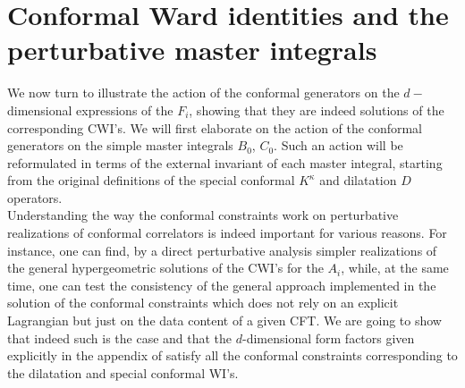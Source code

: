 \documentclass[a4paper,11pt,openright,twoside]{book}
\numberwithin{equation}{section}
\begin{document}
{{\section{Conformal Ward identities and the perturbative master integrals}
We now turn to illustrate the action of the conformal generators on the $d-$dimensional expressions of the $F_i$, showing that they are indeed solutions of the corresponding CWI's. We will first elaborate on the action of the conformal generators on the simple master integrals $B_0$, $C_0$. Such an action will be reformulated in terms of the external invariant of each master integral, starting from the original definitions of the special conformal $K^\kappa$ and dilatation $D$ operators. \\
Understanding the way the conformal constraints work on perturbative realizations of conformal correlators is indeed important for various reasons. For instance, one can find, by a direct perturbative analysis simpler realizations of the general hypergeometric solutions of the CWI's for the $A_i$, while, at the same time, one can test the consistency of the general approach implemented in the solution of the conformal constraints which does not rely on an explicit Lagrangian but just on the data content of a given CFT. We are going to show that indeed such is the case and that the $d$-dimensional form factors given explicitly in the appendix of \cite{Coriano:2018bbe} satisfy all the conformal constraints corresponding to the dilatation and special conformal WI's.

}}
\end{document}
